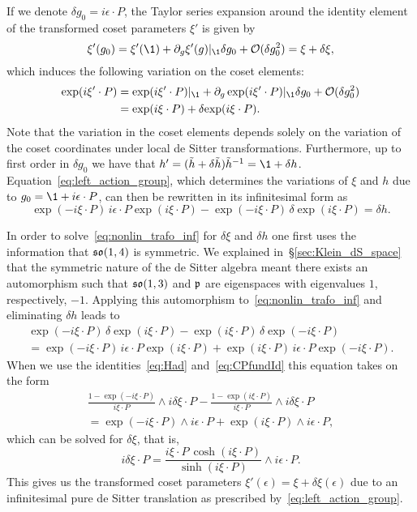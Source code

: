 \documentclass[
final,
11pt,
a4paper,
DIV=11,
headinclude=true,
footinclude=false,
bibliography=totoc,
twoside=true,  %
BCOR=5mm
]{scrbook}
\begin{document}
If we denote $\delta g_0 = i\epsilon \cdot P$, the Taylor series 
expansion around the identity element of the transformed coset 
parameters $\xi'$ is given by
\begin{equation*}
  \xi'(g_0) = \xi'(\1) + \pd_g \xi'(g)|_{\1} \delta g_0 
  + \mc{O}(\delta g_0^2) = \xi + \delta \xi,
\end{equation*}
which induces the following variation on the coset elements:
\begin{align*}
  \exp(i\xi'\cdot P) &= \exp(i\xi'\cdot P)|_{\1} + \pd_g 
  \exp(i\xi'\cdot P)|_{\1} \delta g_0 + \mc{O}(\delta g_0^2) \\
  &= \exp(i\xi\cdot P) + \delta\!\exp(i\xi\cdot P).
\end{align*}
Note that the variation in the coset elements depends solely on 
the variation of the coset coordinates under local de Sitter 
transformations. Furthermore, up to first order in $\delta g_0$ 
we have that $h' = (\tilde{h} + \delta\tilde{h}) \tilde{h}^{-1} 
= \1 + \delta h$. Equation~\eqref{eq:left_action_group}, which 
determines the variations of $\xi$ and $h$ due to $g_0 = \1 
+ i\epsilon \cdot P$, can then be rewritten in its infinitesimal 
form as
\begin{equation}
\label{eq:nonlin_trafo_inf}
  \exp(-i\xi\cdot P)\, i\epsilon\cdot P \exp(i\xi\cdot P) 
  - \exp(-i\xi\cdot P)\, \delta\!\exp(i\xi\cdot P) = \delta h.
\end{equation}

In order to solve~\eqref{eq:nonlin_trafo_inf} for $\delta \xi$ 
and $\delta h$ one first uses the information that $\mathfrak{so}(1,4)$ 
is symmetric. We explained in~\S\ref{sec:Klein_dS_space} that the 
symmetric nature of the de Sitter algebra meant there exists an 
automorphism such that $\mathfrak{so}(1,3)$ and $\mathfrak{p}$ are 
eigenspaces with eigenvalues $1$, respectively, $-1$. Applying 
this automorphism to~\eqref{eq:nonlin_trafo_inf} and eliminating 
$\delta h$ leads to
\begin{multline*}
  \exp(-i\xi\cdot P)\, \delta\!\exp(i\xi\cdot P) - \exp(i\xi\cdot 
  P)\, \delta\!\exp(-i\xi\cdot P)
  \\
  = \exp(-i\xi\cdot P)\, i\epsilon\cdot P \exp(i\xi\cdot P) 
  + \exp(i\xi\cdot P)\, i\epsilon\cdot P \exp(-i\xi\cdot P).
\end{multline*}
When we use the identities~\eqref{eq:Had} and~\eqref{eq:CPfundId} 
this equation takes on the form
\begin{multline*}
  \frac{1-\exp(-i\xi\cdot P)}{i\xi\cdot P} \wedge 
  i\delta\xi\cdot P - \frac{1-\exp(i\xi\cdot P)}{i\xi\cdot P} 
  \wedge i\delta\xi\cdot P
  \\
  = \exp(-i\xi\cdot P) \wedge i\epsilon\cdot P + \exp(i\xi\cdot 
  P) \wedge i\epsilon\cdot P,
\end{multline*}
which can be solved for $\delta \xi$, that is,
\begin{equation}
\label{eq:inftrafo_cosetpar}
  i\delta\xi \cdot P = \frac{i\xi\cdot P\,\cosh(i\xi\cdot 
    P)}{\sinh(i\xi\cdot P)} \wedge i\epsilon\cdot P.
\end{equation}
This gives us the transformed coset parameters $\xi'(\epsilon) 
= \xi + \delta \xi(\epsilon)$ due to an infinitesimal pure de 
Sitter translation as prescribed by~\eqref{eq:left_action_group}.
\end{document}
